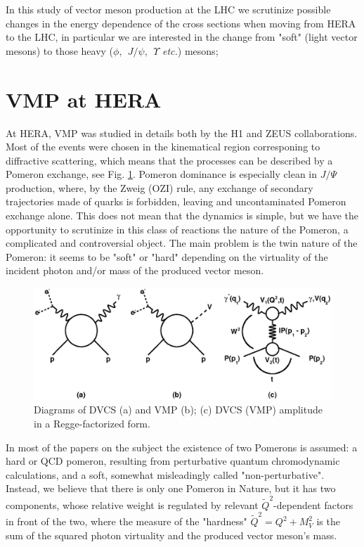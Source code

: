 \documentclass[12pt]{article}
\begin{document}
In this study of vector meson production at the LHC we scrutinize possible changes in the energy dependence of the cross sections when moving from HERA to the LHC, in particular we are interested in the change from "soft" (light vector mesons) to those heavy ($\phi,\ \ J/\psi,\ \ \Upsilon$ {\it etc.}) mesons;

\section{VMP at HERA}
At HERA, VMP was studied in details both by the H1 and ZEUS collaborations. Most of the events were chosen in the 
kinematical region corresponing to diffractive scattering, which means that the processes can be described by a Pomeron exchange, see Fig. \ref{fig:diagrams}. Pomeron dominance is especially clean in $J/\Psi$ production, where,
by the Zweig (OZI) rule, any exchange of secondary trajectories made of quarks is forbidden, leaving and uncontaminated Pomeron exchange alone.  This does not mean that the dynamics is simple, but we have the opportunity 
to scrutinize in this class of reactions the nature of the Pomeron, a complicated and controversial object. 
The main problem is the twin nature of the Pomeron: it seems to be "soft" or "hard" depending on the virtuality of the incident photon and/or mass of the produced vector meson.   
     
\begin{figure}[!h]
\centering
\includegraphics[width=.8\textwidth]{figures/diagrams.eps}
\caption{Diagrams of DVCS (a) and VMP (b); (c) DVCS (VMP) amplitude in a Regge-factorized form.}
\label{fig:diagrams}
\end{figure}

In most of the papers on the subject the existence of two Pomerons is assumed: a hard or QCD pomeron, resulting
from perturbative quantum chromodynamic calculations, and a soft, somewhat misleadingly called "non-perturbative". 
Instead, we believe that there is only one Pomeron in Nature, but it has two components, whose relative weight is 
regulated by relevant $\tilde Q^2$-dependent factors in front of the two, where the measure of the "hardness" $\tilde Q^2=Q^2+M_V^2$ is the sum of the squared photon virtuality and the produced vector meson's mass.  
\end{document}
